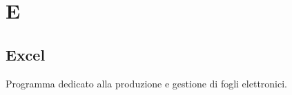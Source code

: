 \section{E}
\subsection{Excel}%
Programma dedicato alla produzione e gestione di fogli elettronici.
\clearpage